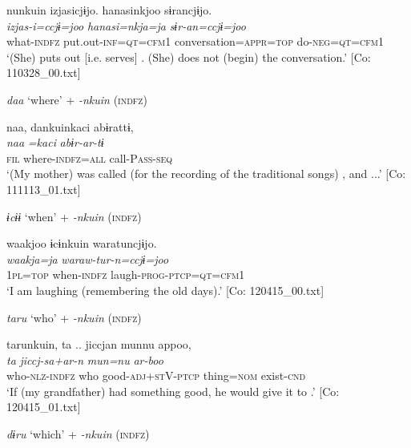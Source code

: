 {\TM}
\glll nunkuin  izjasicjɨjo.  hanasinkjoo  sɨrancjɨjo.\\
\textit{}  \textit{izjas-i=ccjɨ=joo}  \textit{hanasi=nkja=ja}  \textit{sɨr-an=ccjɨ=joo}\\
      what-\textsc{indfz}  put.out-\textsc{inf}=\textsc{qt}=\textsc{cfm}1  conversation=\textsc{appr}=\textsc{top}                  do-\textsc{neg}=\textsc{qt}=\textsc{cfm1}\\
\glt    ‘(She) puts out [i.e. serves] . (She) does not (begin) the conversation.’      [Co: 110328\_00.txt]

\ex \label{ex:7:22b}\textit{daa} ‘where’ + \textit{{}-nkuin} (\textsc{indfz})

{\TM}
\glll  naa,  dankuinkaci  abɨrattɨ,\\
\textit{naa}  \textit{=kaci}  \textit{abɨr-ar-tɨ}\\
\textsc{fil}  where-\textsc{indfz}=\textsc{all}  call-P\textsc{ass}-\textsc{seq}\\
\glt ‘(My mother) was called (for the recording of the traditional songs) , and ...’ [Co: 111113\_01.txt]

\ex \label{ex:7:22c}\textit{ɨcɨɨ} ‘when’ + \textit{{}-nkuin} (\textsc{indfz})

{\TM}
\glll  waakjoo  ɨcɨnkuin  waratuncjɨjo.\\
\textit{waakja=ja}  \textit{}  \textit{waraw-tur-n=ccjɨ=joo}\\
1\textsc{pl}=\textsc{top}  when-\textsc{indfz}  laugh-\textsc{prog}-\textsc{ptcp}=\textsc{qt}=\textsc{cfm}1\\
\glt ‘I am  laughing (remembering the old days).’ [Co: 120415\_00.txt]

\ex \label{ex:7:22d}\textit{taru} ‘who’ + \textit{{}-nkuin} (\textsc{indfz})

{\TM}
\glll  tarunkuin,  ta ..  jiccjan  munnu  appoo,\\
\textit{}  \textit{ta}  \textit{jiccj-sa+ar-n}  \textit{mun=nu}  \textit{ar-boo}\\
who-\textsc{nlz}-\textsc{indfz}  who  good-\textsc{adj}+\textsc{st}V-\textsc{ptcp}  thing=\textsc{nom}  exist-\textsc{cnd}\\
\glt ‘If (my grandfather) had something good, he would give it to .’ [Co: 120415\_01.txt]

\ex \label{ex:7:22e} \textit{dɨru} ‘which’ + \textit{{}-nkuin} (\textsc{indfz})

